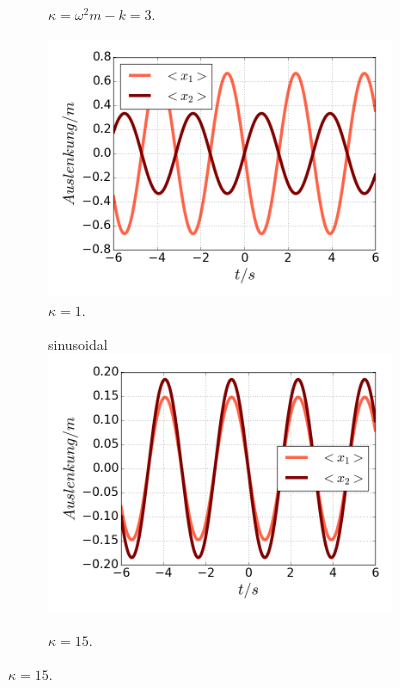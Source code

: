 \begin{figure}
\begin{subfigure}[t]{0.5\textwidth}
          \caption{$\kappa=\omega^2m-k=3$.}
          \label{fig:x1_null}
      \end{subfigure}
      \begin{subfigure}[t]{0.5\textwidth}
        \centering
        \includegraphics[width=\textwidth]{plots/<x12>nlschwach.png}
        \caption{$\kappa=1$.}
        \label{fig:schwach}
      \end{subfigure}
      \begin{subfigure}[t]{0.5\textwidth}sinusoidal
          \centering
          \includegraphics[width=\textwidth]{plots/<x12>nlstark.png}
          \caption{$\kappa=15$.}
          \label{fig:stark}
      \end{subfigure}

\end{figure}
